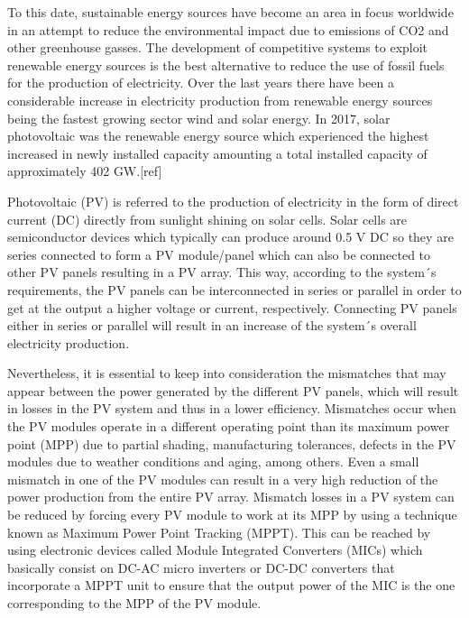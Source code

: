 To this date, sustainable energy sources have become an area in focus worldwide in an attempt to reduce the environmental impact due to emissions of CO2 and other greenhouse gasses. The development of competitive systems to exploit renewable energy sources is the best alternative to reduce the use of fossil fuels for the production of electricity. Over the last years there have been a considerable increase in electricity production from renewable energy sources being the fastest growing sector wind and solar energy. In 2017, solar photovoltaic was the renewable energy source which experienced the highest increased in newly installed capacity amounting a total installed capacity of approximately 402 GW.[ref] %

Photovoltaic (PV) is referred to the production of electricity in the form of direct current (DC) directly from sunlight shining on solar cells. Solar cells are semiconductor devices which typically can produce around 0.5 V DC so they are series connected to form a PV module/panel which can also be connected to other PV panels resulting in a PV array. This way, according to the system´s requirements, the PV panels can be interconnected in series or parallel in order to get at the output a higher voltage or current, respectively. Connecting PV panels either in series or parallel will result in an increase of the system´s overall electricity production.  %

Nevertheless, it is essential to keep into consideration the mismatches that may appear between the power generated by the different PV panels, which will result in losses in the PV system and thus in a lower efficiency. Mismatches occur when the PV modules operate in a different operating point than its maximum power point (MPP) due to partial shading, manufacturing tolerances, defects in the PV modules due to weather conditions and aging, among others. Even a small mismatch in one of the PV modules can result in a very high reduction of the power production from the entire PV array. Mismatch losses in a PV system can be reduced by forcing every PV module to work at its MPP by using a technique known as Maximum Power Point Tracking (MPPT). This can be reached by using electronic devices called Module Integrated Converters (MICs) which basically consist on DC-AC micro inverters or DC-DC converters that incorporate a MPPT unit to ensure that the output power of the MIC is the one corresponding to the MPP of the PV module.%

